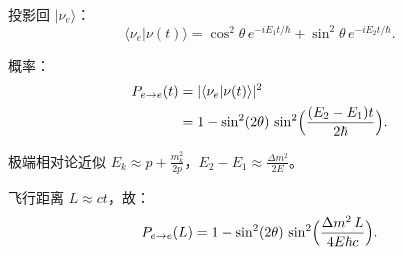 \begin{derivationbox}
投影回 $|\nu_e\rangle$：
\[
\langle\nu_e|\nu(t)\rangle=\cos^2\theta\,e^{-iE_1t/\hbar}+\sin^2\theta\,e^{-iE_2t/\hbar}.
\]

概率：
\begin{align*}
P_{e\to e}(t)&=|\langle\nu_e|\nu(t)\rangle|^2\\
&=1-\sin^2(2\theta)\,\sin^2\Bigl(\frac{(E_2-E_1)t}{2\hbar}\Bigr).
\end{align*}

极端相对论近似 $E_k\approx p+\frac{m_k^2}{2p}$，$E_2-E_1\approx\frac{\Delta m^2}{2E}$。

飞行距离 $L\approx ct$，故：
\[
P_{e\to e}(L)=1-\sin^2(2\theta)\,\sin^2\Bigl(\frac{\Delta m^2\,L}{4E\hbar c}\Bigr).
\]
\end{derivationbox}

\vspace{1em}
